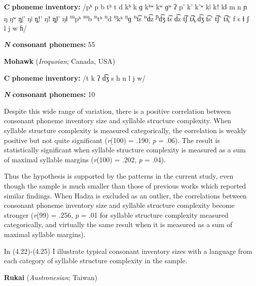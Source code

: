 \textbf{C} \textbf{phoneme} \textbf{inventory:} /pʰ p b tʰ t d kʰ k ɡ kʰʷ kʷ ɡʷ ʔ p’ k’ k’ʷ kǀ kǃ kǁ m n ɲ ŋ ŋʷ ŋ̥ǀ’ ŋǀ ŋ̥ǃ’ ŋǃ ŋ̥ǁ’ ŋǁ \textsuperscript{m}pʰ \textsuperscript{m}b \textsuperscript{n}tʰ \textsuperscript{n}d \textsuperscript{ŋ}kʰ \textsuperscript{ŋ}ɡ \textsuperscript{n}t͡s \textsuperscript{n}d͡z \textsuperscript{ɲ}d͡ʒ t͡s d͡z t͡ʃ t͡ʎ̥ d͡ʒ t͡s’ t͡ʃ’ t͡ʎ̥’ f s ɬ ʃ l j w ɦ/



\textbf{\textit{N}} \textbf{consonant} \textbf{phonemes:} 55


\z

\ea\label{ex:(4.21)}
  \textbf{Mohawk} (\textit{Iroquoian}; Canada, USA)



\textbf{C} \textbf{phoneme} \textbf{inventory:} /t k ʔ d͡ʒ s h n l j w/



\textbf{\textit{N}} \textbf{consonant} \textbf{phonemes:} 10
\z



  Despite this wide range of variation, there is a positive correlation between consonant phoneme inventory size and syllable structure complexity. When syllable structure complexity is measured categorically, the correlation is weakly positive but not quite significant (\textit{r}(100) = .190, \textit{p} = .06). The result is statistically significant when syllable structure complexity is measured as a sum of maximal syllable margins (\textit{r}(100) = .202, \textit{p} = .04).



  Thus the hypothesis is supported by the patterns in the current study, even though the sample is much smaller than those of previous works which reported similar findings. When Hadza is excluded as an outlier, the correlations between consonant phoneme inventory size and syllable structure complexity become stronger (\textit{r}(99) = .256, \textit{p} = .01 for syllable structure complexity measured categorically, and virtually the same result when it is measured as a sum of maximal syllable margins).



  In (4.22)-(4.25) I illustrate typical consonant inventory sizes with a language from each category of syllable structure complexity in the sample.



\ea\label{ex:(4.22)}
  \textbf{Rukai} (\textit{Austronesian}; Taiwan)



